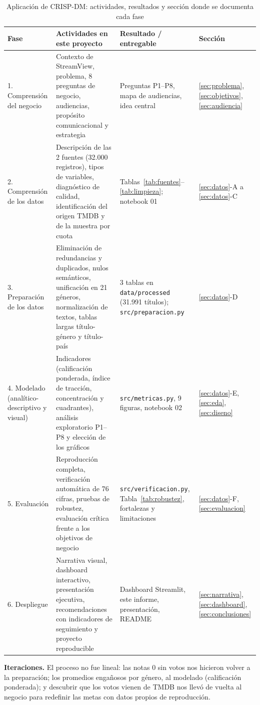 \documentclass[conference,a4paper]{IEEEtran}
\begin{document}
\begin{table}[!t]
\caption{Aplicación de CRISP-DM: actividades, resultados y sección donde se documenta cada fase}
\label{tab:crisp}
\centering\footnotesize
\begin{tabularx}{\textwidth}{@{}P{2.7cm}LP{4.6cm}P{1.9cm}@{}}
\toprule
Fase & Actividades en este proyecto & Resultado / entregable & Sección\\
. Comprensión del negocio & Contexto de StreamView, problema, 8 preguntas de negocio, audiencias, propósito comunicacional y estrategia & Preguntas P1--P8, mapa de audiencias, idea central & \ref{sec:problema}, \ref{sec:objetivos}, \ref{sec:audiencia}\\
2. Comprensión de los datos & Descripción de las 2 fuentes (32.000 registros), tipos de variables, diagnóstico de calidad, identificación del origen TMDB y de la muestra por cuota & Tablas~\ref{tab:fuentes}--\ref{tab:limpieza}; notebook 01 & \ref{sec:datos}-A a \ref{sec:datos}-C\\
3. Preparación de los datos & Eliminación de redundancias y duplicados, nulos semánticos, unificación en 21 géneros, normalización de textos, tablas largas título-género y título-país & 3 tablas en \texttt{data/processed} (31.991 títulos); \texttt{src/preparacion.py} & \ref{sec:datos}-D\\
4. Modelado (analítico-descriptivo y visual) & Indicadores (calificación ponderada, índice de tracción, concentración y cuadrantes), análisis exploratorio P1--P8 y elección de los gráficos & \texttt{src/metricas.py}, 9 figuras, notebook 02 & \ref{sec:datos}-E, \ref{sec:eda}, \ref{sec:diseno}\\
5. Evaluación & Reproducción completa, verificación automática de 76 cifras, pruebas de robustez, evaluación crítica frente a los objetivos de negocio & \texttt{src/verificacion.py}, Tabla~\ref{tab:robustez}, fortalezas y limitaciones & \ref{sec:datos}-F, \ref{sec:evaluacion}\\
6. Despliegue & Narrativa visual, dashboard interactivo, presentación ejecutiva, recomendaciones con indicadores de seguimiento y proyecto reproducible & Dashboard Streamlit, este informe, presentación, README & \ref{sec:narrativa}, \ref{sec:dashboard}, \ref{sec:conclusiones}\\
\bottomrule
\end{tabularx}
\end{table}

\textbf{Iteraciones.} El proceso no fue lineal: las notas 0 sin votos nos hicieron volver a la preparación; los promedios engañosos por género, al modelado (calificación ponderada); y descubrir que los votos vienen de TMDB nos llevó de vuelta al negocio para redefinir las metas con datos propios de reproducción.
\end{document}
